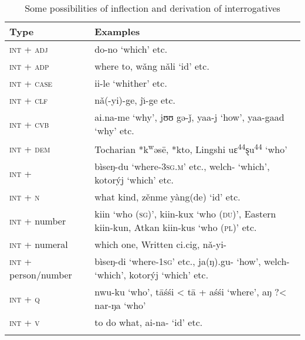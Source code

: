 \begin{table}
\caption{Some possibilities of inflection and derivation of interrogatives}
\label{tab:6:13}

\begin{tabularx}{\textwidth}{lQ}
\lsptoprule

\textbf{Type} & \textbf{Examples}\\
\midrule
\textsc{int} + \textsc{adj} &  do-no ‘which’ etc.\\
\textsc{int} + \textsc{adp} &  where to,  wǎng nǎli ‘id’ etc.\\
\textsc{int} + \textsc{case} &  ii-le ‘whither’ etc.\\
\textsc{int} + \textsc{clf} &  nǎ(-yi)-ge, j\u{\i}-ge etc.\\
\textsc{int} + \textsc{cvb} &  ai.na-me ‘why’,  jʊʊ gə-ǰ,  yaa-j ‘how’, yaa-gaad ‘why’ etc.\\
\textsc{int} + \textsc{dem} & Tocharian *k\textsuperscript{w}əsë,  *kto, Lingshi  uɛ\textsuperscript{44}ȿu\textsuperscript{44} ‘who’\\
\textsc{int} +  &  bìseŋ-du ‘where-\textsc{3sg.m}’ etc.,  welch- ‘which’,  kotorýj ‘which’ etc.\\
\textsc{int} + \textsc{n} &  what kind,  zěnme yàng(de) ‘id’ etc.\\
\textsc{int} + number &  kiin ‘who (\textsc{sg})’, kiin-kux ‘who (\textsc{du})’, Eastern kiin-kun, Atkan kiin-kus ‘who (\textsc{pl})’ etc.\\
\textsc{int +} numeral &  which one, Written  ci.cig,  nǎ-yi-\\
\textsc{int} + person/number &  bìseŋ-di ‘where-\textsc{1sg}’ etc.,  ja(ŋ).gu- ‘how’,  welch- ‘which’,  kotorýj ‘which’ etc.\\
\textsc{int} + \textsc{q} &  nwu{}-ku ‘who’,  t\=aśśi < t\=a + aśśi ‘where’,   aŋ ?< nar-ŋa ‘who’\\
\textsc{int} + \textsc{v} &  to do what,  ai-na- ‘id’ etc.\\
\lspbottomrule
\end{tabularx}
\end{table}

